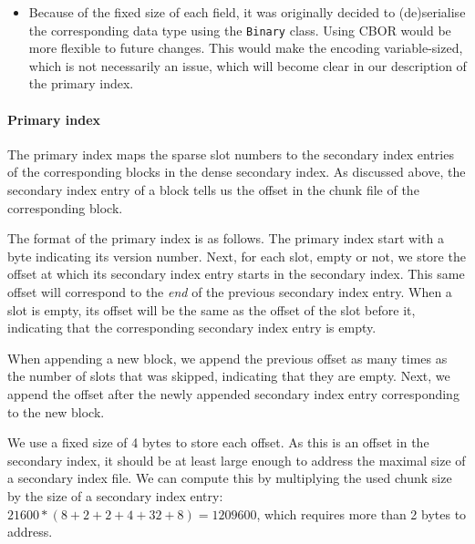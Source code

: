 \begin{itemize}
  Both the \lstinline!SlotNo! and \lstinline!EpochNo! types are newtypes around
  a \lstinline!Word64!, hence the 8 on-disk bytes. We omit the tag
  distinguishing between the two constructors in the serialisation because in
  nearly all cases, this information has already been retrieved from the primary
  index, i.e., whether the first filled slot in a chunk is an EBB or
  not.\footnote{In hindsight, having the tag in the serialisation would have
  simplified the implementation.}

\item Because of the fixed size of each field, it was originally decided to
  (de)serialise the corresponding data type using the \lstinline!Binary! class.
  Using CBOR would be more flexible to future changes. This would make the
  encoding variable-sized, which is not necessarily an issue, which will become
  clear in our description of the primary index.

\end{itemize}

\paragraph{Primary index}

The primary index maps the sparse slot numbers to the secondary index entries of
the corresponding blocks in the dense secondary index. As discussed above, the
secondary index entry of a block tells us the offset in the chunk file of the
corresponding block.

The format of the primary index is as follows. The primary index start with a
byte indicating its version number. Next, for each slot, empty or not, we store
the offset at which its secondary index entry starts in the secondary index.
This same offset will correspond to the \emph{end} of the previous secondary
index entry. When a slot is empty, its offset will be the same as the offset of
the slot before it, indicating that the corresponding secondary index entry is
empty.

When appending a new block, we append the previous offset as many times as the
number of slots that was skipped, indicating that they are empty. Next, we
append the offset after the newly appended secondary index entry corresponding
to the new block.

We use a fixed size of 4 bytes to store each offset. As this is an offset in the
secondary index, it should be at least large enough to address the maximal size
of a secondary index file. We can compute this by multiplying the used chunk
size by the size of a secondary index entry: $\num{21600} * (8 + 2 + 2 + 4 + 32
+ 8) = \num{1209600}$, which requires more than 2 bytes to address.

